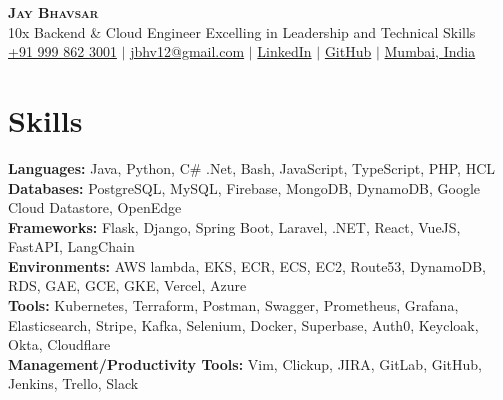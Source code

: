 \documentclass[letterpaper,11pt]{article}
\newcommand{\resumeSubHeadingListStart}{\begin{itemize}[leftmargin=0.15in, label={}]}
\newcommand{\resumeSubHeadingListEnd}{\end{itemize}}
\begin{document}

\begin{center}
  \textbf{\Huge \scshape Jay Bhavsar} \\ \vspace{3pt}
  \normalsize 10x Backend \& Cloud Engineer Excelling in Leadership and Technical Skills \\ \vspace{3pt}
  \small
  \faMobile \hspace{.5pt} \href{tel:919998623001}{+91 999 862 3001}
  $|$
  \faAt \hspace{.5pt} \href{mailto:jbhv12@gmail.com}{jbhv12@gmail.com}
  $|$
  \faLinkedinSquare \hspace{.5pt} \href{https://www.linkedin.com/in/jbhv12/}{LinkedIn}
  $|$
  \faGithub \hspace{.5pt} \href{https://github.com/jbhv12}{GitHub}
  $|$
  \faMapMarker \hspace{.5pt} \href{https://goo.gl/maps/Czh1vXePukiKumpu5}{Mumbai, India}
\end{center}




\section{Skills}
\vspace{2pt}
\resumeSubHeadingListStart
\small{\item{
              \textbf{Languages:}{ Java, Python, C\# .Net, Bash, JavaScript, TypeScript, PHP, HCL} \\ \vspace{3pt}
              \textbf{Databases:}{ PostgreSQL, MySQL, Firebase, MongoDB, DynamoDB, Google Cloud Datastore, OpenEdge} \\ \vspace{3pt}
              \textbf{Frameworks:}{ Flask, Django, Spring Boot, Laravel, .NET, React, VueJS, FastAPI, LangChain} \\ \vspace{3pt}
              \textbf{Environments:}{ AWS lambda, EKS, ECR, ECS, EC2, Route53, DynamoDB, RDS, GAE, GCE, GKE, Vercel, Azure} \\ \vspace{3pt}
              \textbf{Tools:}{ Kubernetes, Terraform, Postman, Swagger, Prometheus, Grafana, Elasticsearch, Stripe, Kafka, Selenium, Docker, Superbase, Auth0, Keycloak, Okta, Cloudflare} \\ \vspace{3pt}
              \textbf{Management/Productivity Tools:}{ Vim, Clickup, JIRA, GitLab, GitHub, Jenkins, Trello, Slack} \\ \vspace{3pt}
        }}
\resumeSubHeadingListEnd
\end{document}
